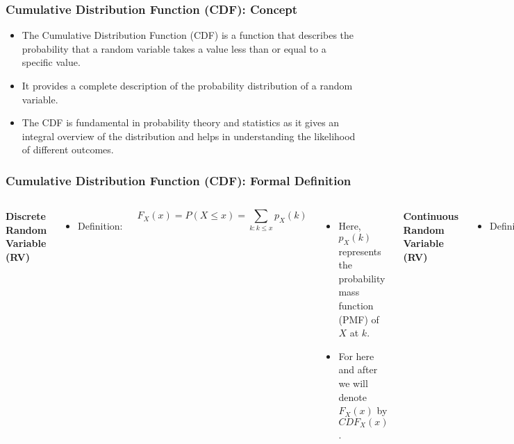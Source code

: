 \documentclass[handout]{beamer} %
\begin{document}
\begin{frame}
\frametitle{Cumulative Distribution Function (CDF): Concept}

\begin{itemize}
  \item The Cumulative Distribution Function (CDF) is a function that describes the probability that a random variable takes a value less than or equal to a specific value.
  \pause
  \item It provides a complete description of the probability distribution of a random variable.
  \pause
  \item The CDF is fundamental in probability theory and statistics as it gives an integral overview of the distribution and helps in understanding the likelihood of different outcomes.
\end{itemize}

\end{frame}

\begin{frame}
\frametitle{Cumulative Distribution Function (CDF): Formal Definition}

\begin{columns}

\textbf{Discrete Random Variable (RV)}
\begin{itemize}
    \item Definition: \vspace{0.7em}
\end{itemize}
  \pause
\small{\[
    F_X(x) = P(X \leq x) = \sum_{k: k \leq x} p_X(k)
\]}
  \pause
\begin{itemize}
    \item Here, $p_X(k)$ represents the probability mass function (PMF) of $X$ at $k$.
    \item For here and after we will denote $F_X(x)$ by $CDF_X(x)$.
\end{itemize}
  \pause

\vspace{-3em}
\textbf{Continuous Random Variable (RV)}
\begin{itemize}
    \item Definition: 
  \pause
\end{itemize}
\small{
\[
  F_X(x) = P(X \leq x) = \int_{-\infty}^x f_X(t) \, dt
\]}
  \pause
\begin{itemize}
    \item $f_X(t)$ is the probability density function (PDF) of $X$. 
    \item For here and after we will denote $F_X(x)$ by $CDF_X(x)$.
\end{itemize}

\end{columns}

\end{frame}
\end{document}

